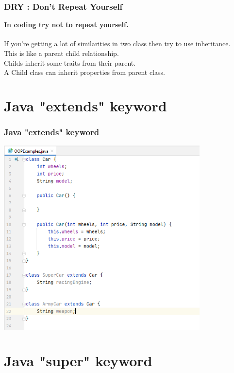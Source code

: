 \documentclass{beamer}
\begin{document}
\begin{frame}
\frametitle{DRY : Don't Repeat Yourself}
\textbf{In coding try not to repeat yourself.}\\~\\
If you're getting a lot of similarities in two class then try to use inheritance.\\
This is like a parent child relationship.\\ Childs inherit some traits from their parent.\\
A Child class can inherit properties from parent class.
\end{frame}

\section{Java "extends" keyword}

\begin{frame}
\frametitle{Java "extends" keyword}
\includegraphics[width=0.8\textwidth]{BasicInheritance.png}
\end{frame}

\section{Java "super" keyword}
\end{document}
